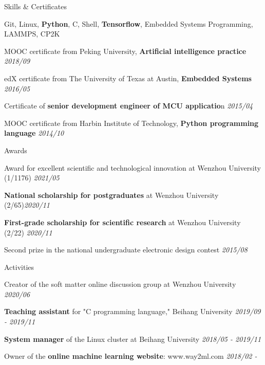 \documentclass{resume} %
\begin{document}
\begin{rSection}{Skills \& Certificates}
\begin{rSubsection}{}{}{}{}
	\item Git, Linux, \textbf{Python}, C, Shell, \textbf{Tensorflow}, Embedded Systems Programming, LAMMPS, CP2K
	\item MOOC certificate from Peking University, \textbf{Artificial intelligence practice} \hfill  \textit{2018/09}
	\item edX certificate from The University of Texas at Austin, \textbf{Embedded Systems}  \hfill \textit{2016/05}
	\item Certificate of \textbf{senior development engineer of MCU applicatio}n  \hfill \textit{2015/04}
	\item MOOC certificate from Harbin Institute of Technology, \textbf{Python programming language} \hfill \textit{2014/10}
\end{rSubsection}
\end{rSection}


\begin{rSection}{Awards}
	\begin{rSubsection}{}{}{}{}
		\item Award for excellent scientific and technological innovation at Wenzhou University (1/1176) \hfill \textit{2021/05}
		\item \textbf{National scholarship for postgraduates} at Wenzhou University (2/65)\hfill \textit{2020/11}
		\item \textbf{First-grade scholarship for scientific research} at Wenzhou University (2/22) \hfill \textit{2020/11}
		\item Second prize in the national undergraduate electronic design contest \hfill \textit{2015/08}
	\end{rSubsection}
\end{rSection}

\begin{rSection}{Activities}
	\begin{rSubsection}{}{}{}{}
		\item Creator of the soft matter online discussion group at Wenzhou University \hfill \textit{2020/06} 
		\item \textbf{Teaching assistant }for  "C programming language," Beihang University \hfill \textit{2019/09 - 2019/11}
		\item \textbf{System manager} of the Linux cluster at Beihang University \hfill \textit{2018/05 - 2019/11}
		\item Owner of the \textbf{online machine learning website}: www.way2ml.com \hfill \textit{2018/02 -}
	\end{rSubsection}
\end{rSection}
\end{document}
